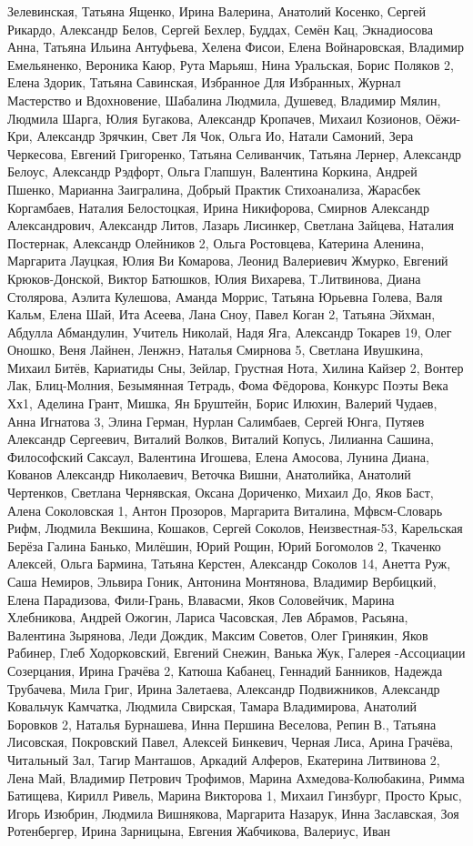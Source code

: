 Зелевинская, Татьяна Ященко, Ирина Валерина, Анатолий Косенко, Сергей Рикардо, Александр Белов, Сергей Бехлер, Буддах, Семён Кац, Экнадиосова Анна, Татьяна Ильина Антуфьева, Хелена Фисои, Елена Войнаровская, Владимир Емельяненко, Вероника Каюр, Рута Марьяш, Нина Уральская, Борис Поляков 2, Елена Здорик, Татьяна Савинская, Избранное Для Избранных, Журнал Мастерство и Вдохновение, Шабалина Людмила, Душевед, Владимир Мялин, Людмила Шарга, Юлия Бугакова, Александр Кропачев, Михаил Козионов, Оёжи-Кри, Александр Зрячкин, Свет Ля Чок, Ольга Ио, Натали Самоний, Зера Черкесова, Евгений Григоренко, Татьяна Селиванчик, Татьяна Лернер, Александр Белоус, Александр Рэдфорт, Ольга Глапшун, Валентина Коркина, Андрей Пшенко, Марианна Заигралина, Добрый Практик Стихоанализа, Жарасбек Коргамбаев, Наталия Белостоцкая, Ирина Никифорова, Смирнов Александр Александрович, Александр Литов, Лазарь Лисинкер, Светлана Зайцева, Наталия Постернак, Александр Олейников 2, Ольга Ростовцева, Катерина Аленина, Маргарита Лауцкая, Юлия Ви Комарова, Леонид Валериевич Жмурко, Евгений Крюков-Донской, Виктор Батюшков, Юлия Вихарева, Т.Литвинова, Диана Столярова, Аэлита Кулешова, Аманда Моррис, Татьяна Юрьевна Голева, Валя Кальм, Елена Шай, Ита Асеева, Лана Сноу, Павел Коган 2, Татьяна Эйхман, Абдулла Абмандулин, Учитель Николай, Надя Яга, Александр Токарев 19, Олег Оношко, Веня Лайнен, Ленжнэ, Наталья Смирнова 5, Светлана Ивушкина, Михаил Битёв, Кариатиды Сны, Зейлар, Грустная Нота, Хилина Кайзер 2, Вонтер Лак, Блиц-Молния, Безымянная Тетрадь, Фома Фёдорова, Конкурс Поэты Века Хх1, Аделина Грант, Мишка, Ян Бруштейн, Борис Илюхин, Валерий Чудаев, Анна Игнатова 3, Элина Герман, Нурлан Салимбаев, Сергей Юнга, Путяев Александр Сергеевич, Виталий Волков, Виталий Копусь, Лилианна Сашина, Философский Саксаул, Валентина Игошева, Елена Амосова, Лунина Диана, Кованов Александр Николаевич, Веточка Вишни, Анатолийка, Анатолий Чертенков, Светлана Чернявская, Оксана Дориченко, Михаил До, Яков Баст, Алена Соколовская 1, Антон Прозоров, Маргарита Виталина, Мфвсм-Словарь Рифм, Людмила Векшина, Кошаков, Сергей Соколов, Неизвестная-53, Карельская Берёза Галина Банько, Милёшин, Юрий Рощин, Юрий Богомолов 2, Ткаченко Алексей, Ольга Бармина, Татьяна Керстен, Александр Соколов 14, Анетта Руж, Саша Немиров, Эльвира Гоник, Антонина Монтянова, Владимир Вербицкий, Елена Парадизова, Фили-Грань, Влавасми, Яков Соловейчик, Марина Хлебникова, Андрей Ожогин, Лариса Часовская, Лев Абрамов, Расьяна, Валентина Зырянова, Леди Дождик, Максим Советов, Олег Гринякин, Яков Рабинер, Глеб Ходорковский, Евгений Снежин, Ванька Жук, Галерея -Ассоциации Созерцания, Ирина Грачёва 2, Катюша Кабанец, Геннадий Банников, Надежда Трубачева, Мила Григ, Ирина Залетаева, Александр Подвижников, Александр Ковальчук Камчатка, Людмила Свирская, Тамара Владимирова, Анатолий Боровков 2, Наталья Бурнашева, Инна Першина Веселова, Репин В., Татьяна Лисовская, Покровский Павел, Алексей Бинкевич, Черная Лиса, Арина Грачёва, Читальный Зал, Тагир Манташов, Аркадий Алферов, Екатерина Литвинова 2, Лена Май, Владимир Петрович Трофимов, Марина Ахмедова-Колюбакина, Римма Батищева, Кирилл Ривель, Марина Викторова 1, Михаил Гинзбург, Просто Крыс, Игорь Изюбрин, Людмила Вишнякова, Маргарита Назарук, Инна Заславская, Зоя Ротенбергер, Ирина Зарницына, Евгения Жабчикова, Валериус, Иван 